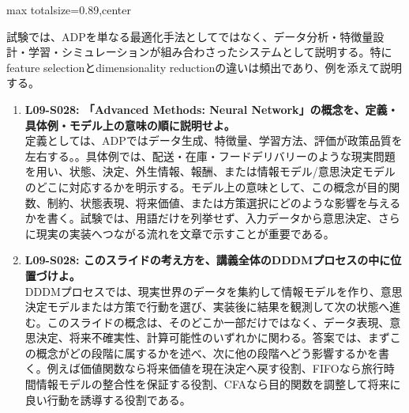 \begin{minipage}[t]{0.58\textwidth}
\begin{adjustbox}{max totalsize={\textwidth}{0.89\textheight},center}
\begin{minipage}{\textwidth}
試験では、ADPを単なる最適化手法としてではなく、データ分析・特徴量設計・学習・シミュレーションが組み合わさったシステムとして説明する。特にfeature selectionとdimensionality reductionの違いは頻出であり、例を添えて説明する。\par{}\begin{enumerate}\item \textbf{L09-S028: 「Advanced Methods: Neural Network」の概念を、定義・具体例・モデル上の意味の順に説明せよ。}\\定義としては、ADPではデータ生成、特徴量、学習方法、評価が政策品質を左右する。。具体例では、配送・在庫・フードデリバリーのような現実問題を用い、状態、決定、外生情報、報酬、または情報モデル/意思決定モデルのどこに対応するかを明示する。モデル上の意味として、この概念が目的関数、制約、状態表現、将来価値、または方策選択にどのような影響を与えるかを書く。試験では、用語だけを列挙せず、入力データから意思決定、さらに現実の実装へつながる流れを文章で示すことが重要である。\item \textbf{L09-S028: このスライドの考え方を、講義全体のDDDMプロセスの中に位置づけよ。}\\DDDMプロセスでは、現実世界のデータを集約して情報モデルを作り、意思決定モデルまたは方策で行動を選び、実装後に結果を観測して次の状態へ進む。このスライドの概念は、そのどこか一部だけではなく、データ表現、意思決定、将来不確実性、計算可能性のいずれかに関わる。答案では、まずこの概念がどの段階に属するかを述べ、次に他の段階へどう影響するかを書く。例えば価値関数なら将来価値を現在決定へ戻す役割、FIFOなら旅行時間情報モデルの整合性を保証する役割、CFAなら目的関数を調整して将来に良い行動を誘導する役割である。\end{enumerate}
\end{minipage}
\end{adjustbox}
\end{minipage}


